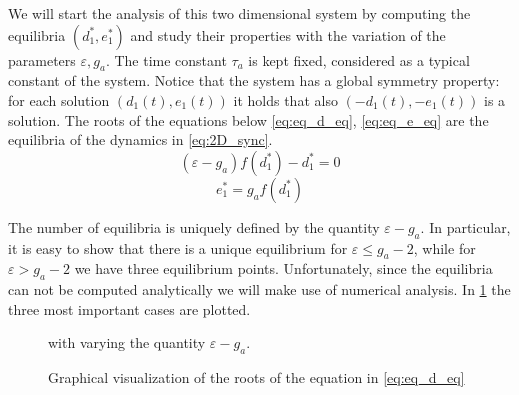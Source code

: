 We will start the analysis of this two dimensional system by computing the equilibria $(d_1^*,e_1^*)$ and study their properties with the variation of the parameters $\varepsilon, g_a$. The time constant $\tau_a$ is kept fixed, considered as a typical constant of the system. Notice that the system has a global symmetry property: for each solution $(d_1(t), e_1(t))$ it holds that also $(-d_1(t), -e_1(t))$ is a solution. The roots of the equations below \eqref{eq:eq_d_eq}, \eqref{eq:eq_e_eq}  are the equilibria of the dynamics in \eqref{eq:2D_sync}.
\begin{equation}
 (\varepsilon - g_a)f(d_1^*) - d_1^* = 0
\label{eq:eq_d_eq}
\end{equation}
\begin{equation}
e_1^* = g_a f(d_1^*)
\label{eq:eq_e_eq}
\end{equation}

The number of equilibria is uniquely defined by the quantity $\varepsilon-g_a$. In particular, it is easy to show that there is a unique equilibrium for $\varepsilon \leq g_a-2$, while for $\varepsilon > g_a-2$ we have three equilibrium points. Unfortunately, since the equilibria can not be computed analytically we will make use of numerical analysis. In \cref{fig:eq2D_adapt} the three most important cases are plotted.

 \begin{figure}[!h]
        \caption{\label{fig:eq2D_adapt} Graphical visualization of the roots of the equation in \eqref{eq:eq_d_eq}} with varying the quantity $\varepsilon - g_a$.
\end{figure}

